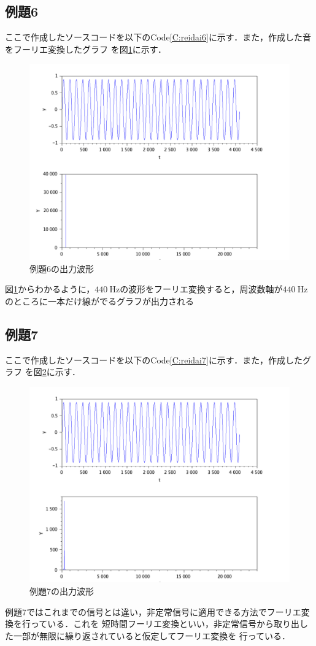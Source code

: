 \documentclass[a4paper,11pt]{jsarticle}
\begin{document}
  \subsection{例題6}
    ここで作成したソースコードを以下のCode\ref{C:reidai6}に示す．また，作成した音をフーリエ変換したグラフ
    を図\ref{G:reidai6}に示す．
    
    \begin{figure}[H]
      \centering
      \includegraphics[width=0.8\linewidth]{picture/reidai6.png}
      \caption{例題6の出力波形}
      \label{G:reidai6}
    \end{figure}
    図\ref{G:reidai6}からわかるように，$\SI{440}{\hertz}$の波形をフーリエ変換すると，周波数軸が$\SI{440}{\hertz}$
    のところに一本だけ線がでるグラフが出力される

  \subsection{例題7}
    ここで作成したソースコードを以下のCode\ref{C:reidai7}に示す．また，作成したグラフ
    を図\ref{G:reidai7}に示す．
    
    \begin{figure}[H]
      \centering
      \includegraphics[width=0.8\linewidth]{picture/reidai7.png}
      \caption{例題7の出力波形}
      \label{G:reidai7}
    \end{figure}
    例題7ではこれまでの信号とは違い，非定常信号に適用できる方法でフーリエ変換を行っている．これを
    短時間フーリエ変換といい，非定常信号から取り出した一部が無限に繰り返されていると仮定してフーリエ変換を
    行っている．
\end{document}
